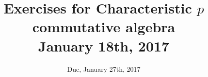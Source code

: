 \documentclass[12pt]{amsart}
\numberwithin{equation}{theorem}
\renewcommand{\:}{\colon}
\theoremstyle{theorem}
\begin{document}
\title{Exercises for Characteristic $p$ commutative algebra\\January 18th, 2017}
\author{Due, January 27th, 2017}



\maketitle

%
%
\end{document}
